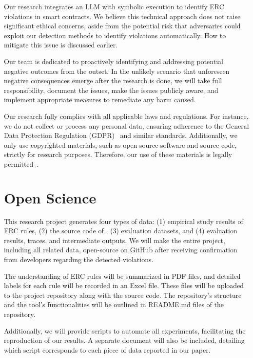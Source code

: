 Our research integrates an LLM with symbolic execution to identify ERC violations 
in smart contracts. We believe this technical approach does not raise 
significant ethical concerns, aside from the potential risk that adversaries could exploit our detection methods to identify violations automatically. 
How to mitigate this issue is discussed earlier. 

Our team is dedicated to proactively identifying and addressing 
potential negative outcomes from the outset. 
In the unlikely scenario that unforeseen negative consequences 
emerge after the research is done, we will take full responsibility, 
document the issues, make the issues publicly aware, and implement appropriate measures to remediate 
any harm caused.


Our research fully complies with all applicable 
laws and regulations. For instance, we do not collect or process any personal data, ensuring 
adherence to the General Data Protection Regulation (GDPR)~\cite{gdpr} and similar standards. 
Additionally, we only use copyrighted materials, such as open-source software and source code, 
strictly for research purposes. Therefore, our use of these materials is legally 
permitted~\cite{copyright-law}.

\section*{Open Science}
This research project generates four types of 
data: (1) empirical study results of ERC rules, 
(2) the source code of \Tool{}, (3) evaluation 
datasets, and (4) evaluation results, traces, and intermediate outputs. We will make the entire 
project, including all related data, open-source 
on GitHub after receiving confirmation from 
developers regarding the detected violations.

The understanding of ERC rules will be summarized 
in PDF files, and detailed labels for each rule 
will be recorded in an Excel file. These files 
will be uploaded to the project repository along 
with the source code. The repository’s structure 
and the tool’s functionalities will be outlined in 
README.md files of the repository.

Additionally, we will provide scripts to automate 
all experiments, facilitating the reproduction of 
our results. A separate document will also be 
included, detailing which script corresponds to 
each piece of data reported in our paper.